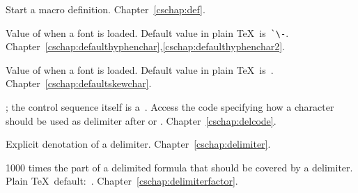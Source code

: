 \begin{glossinventory}
\item [\cs{def}]
       Start a macro definition.
Chapter~\ref{cschap:def}.

\item [\cs{defaulthyphenchar}]
      Value of  when a font is loaded.
      Default value in plain \TeX\ is~\verb>`\->.
Chapter~\ref{cschap:defaulthyphenchar},\ref{cschap:defaulthyphenchar2}.

\item [\cs{defaultskewchar}]
      Value of  when a font is loaded.
      Default value in plain \TeX\ is~.
Chapter~\ref{cschap:defaultskewchar}.

\item [\cs{delcode\gr{8-bit number}}]
      ; the control sequence itself
      is a~.
      Access the
      code specifying how a character should be used as delimiter 
      after  or .
Chapter~\ref{cschap:delcode}.

\item [\cs{delimiter\gr{27-bit number}}]
      Explicit denotation of a delimiter.
Chapter~\ref{cschap:delimiter}.

\item [\cs{delimiterfactor}]
      1000 times the part of a delimited formula that should be
      covered by a delimiter.
      Plain \TeX\ default:~.
Chapter~\ref{cschap:delimiterfactor}.


\end{glossinventory}
